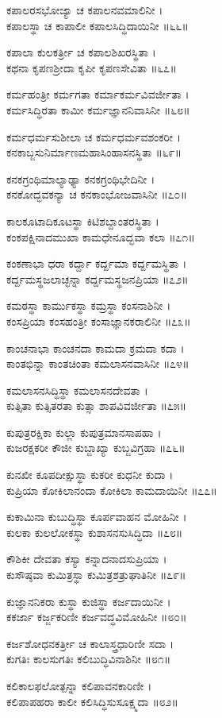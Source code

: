 ಕಪಾಲರಸಭೋಜ್ಯಾ ಚ ಕಪಾಲನವಮಾಲಿನೀ ।\\
ಕಪಾಲಸ್ಥಾ ಚ ಕಾಪಾಲೀ ಕಪಾಲಸಿದ್ಧಿದಾಯಿನೀ ॥೬೬॥

ಕಪಾಲಾ ಕುಲಕರ್ತ್ರೀ ಚ ಕಪಾಲಶಿಖರಸ್ಥಿತಾ ।\\
ಕಥನಾ ಕೃಪಣಶ್ರೀದಾ ಕೃಪೀ ಕೃಪಣಸೇವಿತಾ ॥೬೭॥

ಕರ್ಮಹಂತ್ರೀ ಕರ್ಮಗತಾ ಕರ್ಮಾಕರ್ಮವಿವರ್ಜೀತಾ ।\\
ಕರ್ಮಸಿದ್ಧಿರತಾ ಕಾಮೀ ಕರ್ಮಜ್ಞಾನನಿವಾಸಿನೀ ॥೬೮॥

ಕರ್ಮಧರ್ಮಸುಶೀಲಾ ಚ ಕರ್ಮಧರ್ಮವಶಂಕರೀ ।\\
ಕನಕಾಬ್ಜಸುನಿರ್ಮಾಣಮಹಾಸಿಂಹಾಸನಸ್ಥಿತಾ ॥೬೯॥

ಕನಕಗ್ರಂಥಿಮಾಲ್ಯಾಢ್ಯಾ ಕನಕಗ್ರಂಥಿಭೇದಿನೀ ।\\
ಕನಕೋದ್ಭವಕನ್ಯಾ ಚ ಕನಕಾಂಭೋಜವಾಸಿನೀ ॥೭೦॥

ಕಾಲಕೂಟಾದಿಕೂಟಸ್ಥಾ ಕಿಟಿಶಬ್ದಾಂತರಸ್ಥಿತಾ ।\\
ಕಂಕಪಕ್ಷಿನಾದಮುಖಾ ಕಾಮಧೇನೂದ್ಭವಾ ಕಲಾ ॥೭೧॥

ಕಂಕಣಾಭಾ ಧರಾ ಕರ್ದ್ದಾ ಕರ್ದ್ದಮಾ ಕರ್ದ್ದಮಸ್ಥಿತಾ ।\\
ಕರ್ದ್ದಮಸ್ಥಜಲಾಚ್ಛನ್ನಾ ಕರ್ದ್ದಮಸ್ಥಜನಪ್ರಿಯಾ ॥೭೨॥

ಕಮಠಸ್ಥಾ ಕಾರ್ಮುಕಸ್ಥಾ ಕಮ್ರಸ್ಥಾ ಕಂಸನಾಶಿನೀ ।\\
ಕಂಸಪ್ರಿಯಾ ಕಂಸಹಂತ್ರೀ ಕಂಸಾಜ್ಞಾನಕರಾಲಿನೀ ॥೭೩॥

ಕಾಂಚನಾಭಾ ಕಾಂಚನದಾ ಕಾಮದಾ ಕ್ರಮದಾ ಕದಾ ।\\
ಕಾಂತಭಿನ್ನಾ ಕಾಂತಚಿಂತಾ ಕಮಲಾಸನವಾಸಿನೀ ॥೭೪॥

ಕಮಲಾಸನಸಿದ್ಧಿಸ್ಥಾ ಕಮಲಾಸನದೇವತಾ ।\\
ಕುತ್ಸಿತಾ ಕುತ್ಸಿತರತಾ ಕುತ್ಸಾ ಶಾಪವಿವರ್ಜೀತಾ ॥೭೫॥

ಕುಪುತ್ರರಕ್ಷಿಕಾ ಕುಲ್ಲಾ ಕುಪುತ್ರಮಾನಸಾಪಹಾ ।\\
ಕುಜರಕ್ಷಕರೀ ಕೌಜೀ ಕುಬ್ಜಾಖ್ಯಾ ಕುಬ್ಜವಿಗ್ರಹಾ ॥೭೬॥

ಕುನಖೀ ಕೂಪದೀಕ್ಷುಸ್ಥಾ ಕುಕರೀ ಕುಧನೀ ಕುದಾ ।\\
ಕುಪ್ರಿಯಾ ಕೋಕಿಲಾನಂದಾ ಕೋಕಿಲಾ ಕಾಮದಾಯಿನೀ ॥೭೭॥

ಕುಕಾಮಿನಾ ಕುಬುದ್ಧಿಸ್ಥಾ ಕೂರ್ಪವಾಹನ ಮೋಹಿನೀ ।\\
ಕುಲಕಾ ಕುಲಲೋಕಸ್ಥಾ ಕುಶಾಸನಸುಸಿದ್ಧಿದಾ ॥೭೮॥

ಕೌಶಿಕೀ ದೇವತಾ ಕಸ್ಯಾ ಕನ್ನಾದನಾದಸುಪ್ರಿಯಾ ।\\
ಕುಸೌಷ್ಠವಾ ಕುಮಿತ್ರಸ್ಥಾ ಕುಮಿತ್ರಶತ್ರುಘಾತಿನೀ ॥೭೯॥

ಕುಜ್ಞಾನನಿಕರಾ ಕುಸ್ಥಾ ಕುಜಿಸ್ಥಾ ಕರ್ಜದಾಯಿನೀ ।\\
ಕಕರ್ಜಾ ಕರ್ಜ್ಜಕರಿಣೀ ಕರ್ಜವದ್ಧವಿಮೋಹಿನೀ ॥೮೦॥

ಕರ್ಜಶೋಧನಕರ್ತ್ರೀ ಚ ಕಾಲಾಸ್ತ್ರಧಾರಿಣೀ ಸದಾ ।\\
ಕುಗತಿಃ ಕಾಲಸುಗತಿಃ ಕಲಿಬುದ್ಧಿವಿನಾಶಿನೀ ॥೮೧॥

ಕಲಿಕಾಲಫಲೋತ್ಪನ್ನಾ ಕಲಿಪಾವನಕಾರಿಣೀ ।\\
ಕಲಿಪಾಪಹರಾ ಕಾಲೀ ಕಲಿಸಿದ್ಧಿಸುಸೂಕ್ಷ್ಮದಾ ॥೮೨॥

